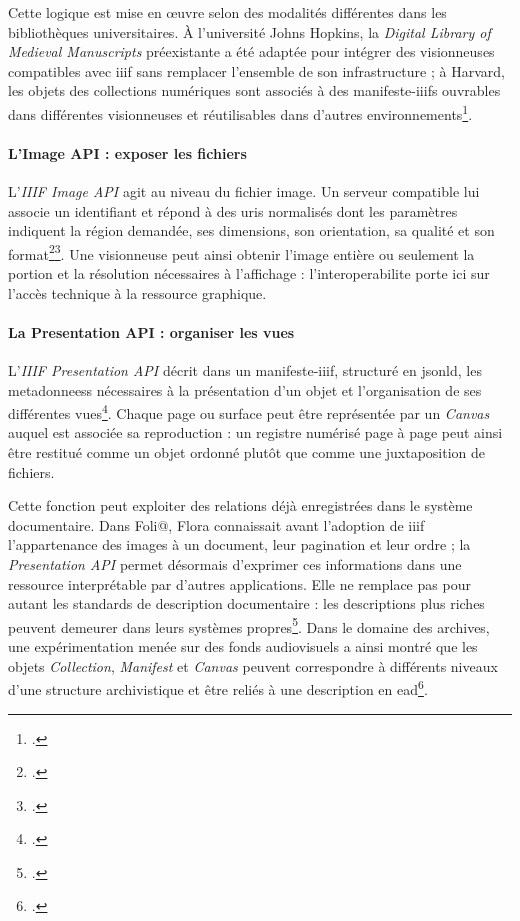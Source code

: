 Cette logique est mise en œuvre selon des modalités différentes dans les bibliothèques universitaires. À l'université Johns Hopkins, la \emph{Digital Library of Medieval Manuscripts} préexistante a été adaptée pour intégrer des visionneuses compatibles avec \gls{iiif} sans remplacer l'ensemble de son infrastructure ; à Harvard, les objets des collections numériques sont associés à des \glspl{manifeste-iiif} ouvrables dans différentes visionneuses et réutilisables dans d'autres environnements\footcite{ChenZhang2021IIIF}.

\paragraph{L'Image API : exposer les fichiers}

L'\emph{IIIF Image API} agit au niveau du fichier image. Un serveur compatible lui associe un identifiant et répond à des \glspl{uri} normalisés dont les paramètres indiquent la région demandée, ses dimensions, son orientation, sa qualité et son format\footcite{IIIFImageAPI}\footcite{SnydmanSandersonCramer2015}. Une visionneuse peut ainsi obtenir l'image entière ou seulement la portion et la résolution nécessaires à l'affichage : l'\gls{interoperabilite} porte ici sur l'accès technique à la ressource graphique.

\paragraph{La Presentation API : organiser les vues}

L'\emph{IIIF Presentation API} décrit dans un \gls{manifeste-iiif}, structuré en \gls{jsonld}, les \glspl{metadonnees} nécessaires à la présentation d'un objet et l'organisation de ses différentes vues\footcite{IIIFPresentationAPI}. Chaque page ou surface peut être représentée par un \emph{Canvas} auquel est associée sa reproduction : un registre numérisé page à page peut ainsi être restitué comme un objet ordonné plutôt que comme une juxtaposition de fichiers.

Cette fonction peut exploiter des relations déjà enregistrées dans le système documentaire. Dans Foli@, Flora connaissait avant l'adoption de \gls{iiif} l'appartenance des images à un document, leur pagination et leur ordre ; la \emph{Presentation API} permet désormais d'exprimer ces informations dans une ressource interprétable par d'autres applications. Elle ne remplace pas pour autant les standards de description documentaire : les descriptions plus riches peuvent demeurer dans leurs systèmes propres\footcite{SnydmanSandersonCramer2015}. Dans le domaine des archives, une expérimentation menée sur des fonds audiovisuels a ainsi montré que les objets \emph{Collection}, \emph{Manifest} et \emph{Canvas} peuvent correspondre à différents niveaux d'une structure archivistique et être reliés à une description en \gls{ead}\footcite{Critelli2026IIIFArchives}.

